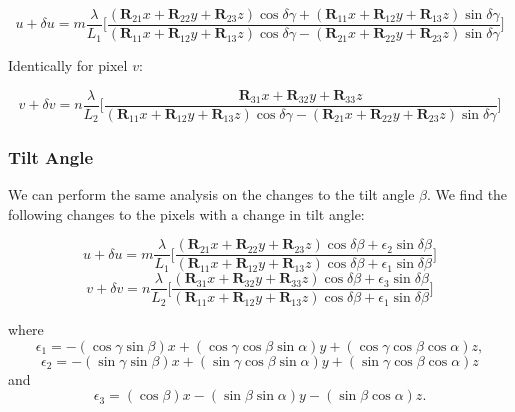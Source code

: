 \documentclass[12pt]{article}
\newcommand{\mtx}[1]{\ensuremath{\mathbf{#1}}}
\begin{document}
\begin{equation}\label{dugamma}
    u + \delta u = m\frac{\lambda}{L_1}
        \bigg[\frac{(\mtx{R}_{21}x + \mtx{R}_{22}y + \mtx{R}_{23}z)\cos\delta\gamma 
                  + (\mtx{R}_{11}x + \mtx{R}_{12}y + \mtx{R}_{13}z)\sin\delta\gamma}
                   {(\mtx{R}_{11}x + \mtx{R}_{12}y + \mtx{R}_{13}z)\cos\delta\gamma -(\mtx{R}_{21}x + \mtx{R}_{22}y + \mtx{R}_{23}z)\sin\delta\gamma}                  
        \bigg]
\end{equation}

Identically for pixel $v$:

\begin{equation}\label{dvgamma}
    v + \delta v = n\frac{\lambda}{L_2}
        \bigg[\frac{\mtx{R}_{31}x + \mtx{R}_{32}y + \mtx{R}_{33}z}
                   {(\mtx{R}_{11}x + \mtx{R}_{12}y + \mtx{R}_{13}z)\cos\delta\gamma -(\mtx{R}_{21}x + \mtx{R}_{22}y + \mtx{R}_{23}z)\sin\delta\gamma}                  
        \bigg]
\end{equation}

\subsubsection{Tilt Angle}

We can perform the same analysis on the changes to the tilt angle $\beta$. We find the following changes to the pixels with a change in tilt angle:

\begin{equation}\label{dubeta}
    u + \delta u = m\frac{\lambda}{L_1}
        \bigg[\frac{(\mtx{R}_{21}x + \mtx{R}_{22}y + \mtx{R}_{23}z)\cos\delta\beta 
                  + \epsilon_2\sin\delta\beta}
                   {(\mtx{R}_{11}x + \mtx{R}_{12}y + \mtx{R}_{13}z)\cos\delta\beta
                  + \epsilon_1\sin\delta\beta}                  
        \bigg]
\end{equation}
\begin{equation}\label{dvbeta}
    v + \delta v = n\frac{\lambda}{L_2}
        \bigg[\frac{(\mtx{R}_{31}x + \mtx{R}_{32}y + \mtx{R}_{33}z)\cos\delta\beta 
                  + \epsilon_3\sin\delta\beta}
                   {(\mtx{R}_{11}x + \mtx{R}_{12}y + \mtx{R}_{13}z)\cos\delta\beta
                  + \epsilon_1\sin\delta\beta}                  
        \bigg]
\end{equation}

where
$$
\epsilon_1 = -(\cos\gamma\sin\beta)x + (\cos\gamma\cos\beta\sin\alpha) y + (\cos\gamma\cos\beta\cos\alpha) z,
$$
$$
\epsilon_2 = -(\sin\gamma\sin\beta)x + (\sin\gamma\cos\beta\sin\alpha) y + (\sin\gamma\cos\beta\cos\alpha) z
$$
and
$$
\epsilon_3 = (\cos\beta)x - (\sin\beta\sin\alpha) y - (\sin\beta\cos\alpha) z.
$$
\end{document}
